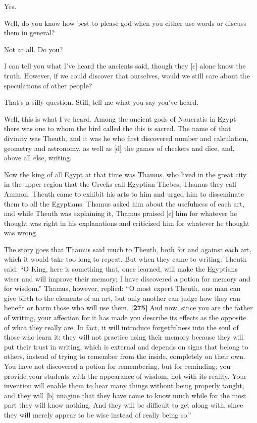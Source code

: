 \sayphaedrus Yes.

\saysocrates Well, do you know how best to please god when you either use
words or discuss them in general?

\sayphaedrus Not at all. Do you?

\saysocrates I can tell you what I've heard the ancients said, though they
{[}c{]} alone know the truth. However, if we could discover that
ourselves, would we still care about the speculations of other people?

\sayphaedrus That's a silly question. Still, tell me what you say you've
heard.

\saysocrates Well, this is what I've heard. Among the ancient gods of
Naucratis in Egypt
there was one to whom the bird called the ibis is sacred. The name of
that divinity was
Theuth, and it was he
who first discovered number and calculation, geometry and astronomy, as
well as {[}d{]} the games of checkers and dice, and, above all else,
writing.

Now the king of all Egypt at that time was
Thamus, who lived in
the great city in the upper region that the Greeks call Egyptian Thebes;
Thamus they call
Ammon. Theuth came to
exhibit his arts to him and urged him to disseminate them to all the
Egyptians. Thamus asked him about the usefulness of each art, and while
Theuth was explaining it, Thamus praised {[}e{]} him for whatever he
thought was right in his explanations and criticized him for whatever he
thought was wrong.

The story goes that Thamus said much to Theuth, both for and against
each art, which it would take too long to repeat. But when they came to
writing, Theuth said: “O King, here is something that, once learned,
will make the Egyptians wiser and will improve their memory; I have
discovered a potion for memory and for wisdom.” Thamus, however,
replied: “O most expert Theuth, one man can give birth to the elements
of an art, but only another can judge how they can benefit or harm those
who will use them. {\bf {[}275{]}} And now, since you are the father of
writing, your affection for it has made you describe its effects as the
opposite of what they really are. In fact, it will introduce
forgetfulness into the soul of those who learn it: they will not
practice using their memory because they will put their trust in
writing, which is external and depends on signs that belong to others,
instead of trying to remember from the inside, completely on their own.
You have not discovered a potion for remembering, but for reminding; you
provide your students with the appearance of wisdom, not with its
reality. Your invention will enable them to hear many things without
being properly taught, and they will {[}b{]} imagine that they have come
to know much while for the most part they will know nothing. And they
will be difficult to get along with, since they will merely appear to be
wise instead of really being so.”

